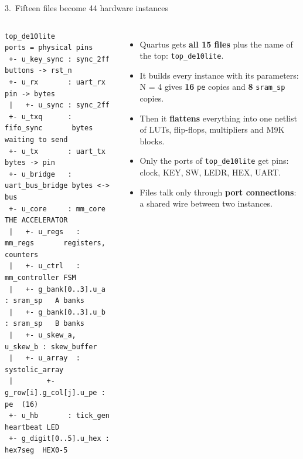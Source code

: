 \documentclass[aspectratio=169,11pt]{beamer}
\newcommand{\sig}[1]{\texttt{#1}}
\begin{document}
\begin{frame}[fragile]{3.\ Fifteen files become 44 hardware instances}
  \begin{columns}[T]
\begin{lstlisting}[basicstyle=\ttfamily\fontsize{6.6}{7.9}\selectfont]
top_de10lite              ports = physical pins
 +- u_key_sync : sync_2ff        buttons -> rst_n
 +- u_rx       : uart_rx         pin -> bytes
 |   +- u_sync : sync_2ff
 +- u_txq      : fifo_sync       bytes waiting to send
 +- u_tx       : uart_tx         bytes -> pin
 +- u_bridge   : uart_bus_bridge bytes <-> bus
 +- u_core     : mm_core         THE ACCELERATOR
 |   +- u_regs   : mm_regs       registers, counters
 |   +- u_ctrl   : mm_controller FSM
 |   +- g_bank[0..3].u_a : sram_sp   A banks
 |   +- g_bank[0..3].u_b : sram_sp   B banks
 |   +- u_skew_a, u_skew_b : skew_buffer
 |   +- u_array  : systolic_array
 |        +- g_row[i].g_col[j].u_pe : pe  (16)
 +- u_hb       : tick_gen        heartbeat LED
 +- g_digit[0..5].u_hex : hex7seg  HEX0-5
\end{lstlisting}
    \small
    \begin{itemize}
      \item Quartus gets \textbf{all 15 files} plus the name of the top: \sig{top\_de10lite}.
      \item It builds every instance with its parameters: N = 4 gives \textbf{16} \sig{pe} copies and
            \textbf{8} \sig{sram\_sp} copies.
      \item Then it \textbf{flattens} everything into one netlist of LUTs, flip-flops, multipliers and M9K blocks.
      \item Only the ports of \sig{top\_de10lite} get pins: clock, KEY, SW, LEDR, HEX, UART.
      \item Files talk only through \textbf{port connections}: a shared wire between two instances.
    \end{itemize}
  \end{columns}
\end{frame}

\end{document}

